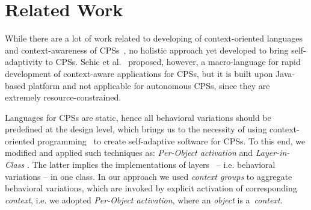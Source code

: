 \section{Related Work}
\label{sec:related}

While there are a lot of work related to developing of context-oriented
languages~\cite{Sehic11,Kamina11,Bardram05} and context-awareness of
CPSs~\cite{Wood08,Sehic11,Ghezzi10}, no holistic approach yet developed to bring
self-adaptivity to CPSs. Sehic et al.~\cite{Sehic11} proposed, however, a macro-language for rapid
development of context-aware applications for CPSs, but it is built upon Java-based
platform and not applicable for autonomous CPSs, since they are extremely resource-constrained. 

Languages for CPSs are static, hence all behavioral variations should be predefined at the design
level, which brings us to the necessity of using context-oriented programming~\cite{Salvaneschi11}
to create self-adaptive software for CPSs. To this end, we modified and applied such
techniques as: \emph{Per-Object activation} and \emph{Layer-in-Class} \cite{Salvaneschi12}.
The latter implies the implementations of layers~\cite{Costanza11} -- i.e. behavioral variations --
in one class. In our approach we used \emph{context groups} to aggregate behavioral variations,
which are invoked by explicit activation of corresponding \emph{context}, i.e. we adopted
\emph{Per-Object activation}, where an \emph{object} is a~\emph{context}.